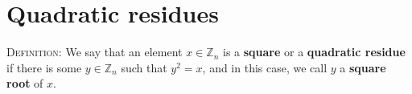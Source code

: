 \documentclass[12pt]{amsart}
\newcommand{\Z}{\mathbb{Z}}
\newcommand{\showsol}[1]{\def\displaysol{#1}}
\begin{document}
\showsol{0}
	
	\thispagestyle{empty}
	
	\section*{Quadratic residues}
	
	
\begin{framed}
\noindent \textsc{Definition:} We say that an element $x\in \Z_n$ is a \textbf{square} or a \textbf{quadratic residue} if there is some $y\in \Z_n$ such that $y^2=x$, and in this case, we call $y$ a \textbf{square root} of $x$. %
\end{framed}
\end{document}
